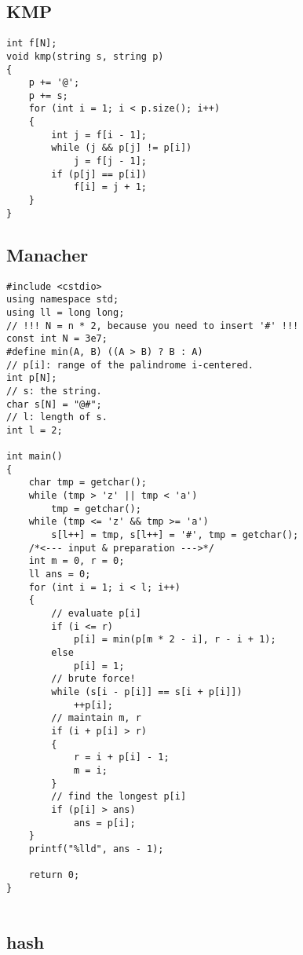 \documentclass[]{article}
\begin{document}
\hypertarget{kmp}{%
\subsection{KMP}\label{kmp}}

\begin{verbatim}
int f[N];
void kmp(string s, string p)
{
    p += '@';
    p += s;
    for (int i = 1; i < p.size(); i++)
    {
        int j = f[i - 1];
        while (j && p[j] != p[i])
            j = f[j - 1];
        if (p[j] == p[i])
            f[i] = j + 1;
    }
}
\end{verbatim}

\hypertarget{manacher}{%
\subsection{Manacher}\label{manacher}}

\begin{verbatim}
#include <cstdio>
using namespace std;
using ll = long long;
// !!! N = n * 2, because you need to insert '#' !!!
const int N = 3e7;
#define min(A, B) ((A > B) ? B : A)
// p[i]: range of the palindrome i-centered. 
int p[N];
// s: the string.
char s[N] = "@#";
// l: length of s.
int l = 2;

int main()
{
    char tmp = getchar();
    while (tmp > 'z' || tmp < 'a')
        tmp = getchar();
    while (tmp <= 'z' && tmp >= 'a')
        s[l++] = tmp, s[l++] = '#', tmp = getchar();
    /*<--- input & preparation --->*/
    int m = 0, r = 0;
    ll ans = 0;
    for (int i = 1; i < l; i++)
    {
        // evaluate p[i]
        if (i <= r)
            p[i] = min(p[m * 2 - i], r - i + 1);
        else
            p[i] = 1;
        // brute force!
        while (s[i - p[i]] == s[i + p[i]])
            ++p[i];
        // maintain m, r
        if (i + p[i] > r)
        {
            r = i + p[i] - 1;
            m = i;
        }
        // find the longest p[i]
        if (p[i] > ans)
            ans = p[i]; 
    }
    printf("%lld", ans - 1);

    return 0;
}
    
\end{verbatim}

\hypertarget{hash}{%
\subsection{hash}\label{hash}}
\end{document}
